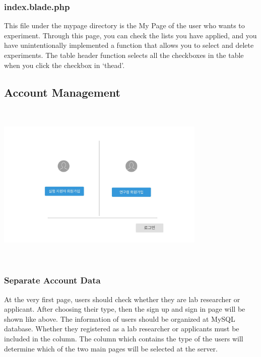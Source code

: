 \documentclass[letterpaper, 10 pt, conference]{ieeeconf}  %
\begin{document}
\subsubsection{index.blade.php}
This file under the mypage directory is the My Page of the user who wants to experiment. Through this page, you can check the lists you have applied, and you have unintentionally implemented a function that allows you to select and delete experiments. The table header function selects all the checkboxes in the table when you click the checkbox in ‘thead’.\\







\subsection{Account Management}




\includegraphics[width=10cm,height=8cm]{Oven/01_firstpage}

\subsubsection{Separate Account Data}
At the very first page, users should check whether they are lab researcher or applicant. After choosing their type, then the sign up and sign in page will be shown like above. The information of users should be organized at MySQL database. Whether they registered as a lab researcher or applicants must be included in the column. The column which contains the type of the users will determine which of the two main pages will be selected at the server. \\
\end{document}
